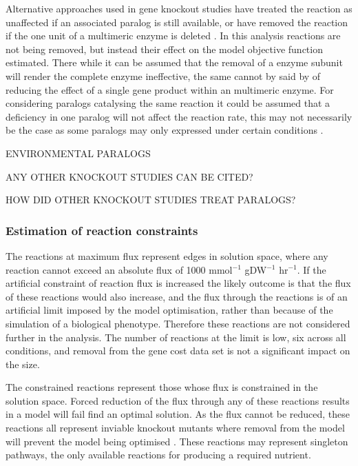 Alternative approaches used in gene knockout studies have treated the reaction as unaffected if an associated paralog is still available, or have removed the reaction if the one unit of a multimeric enzyme is deleted \cite{pal2006}. In this analysis reactions are not being removed, but instead their effect on the model objective function estimated. There while it can be assumed that the removal of a enzyme subunit will render the complete enzyme ineffective, the same cannot by said by of reducing the effect of a single gene product within an multimeric enzyme. For considering paralogs catalysing the same reaction it could be assumed that a deficiency in one paralog will not affect the reaction rate, this may not necessarily be the case as some paralogs may only expressed under certain conditions \cite{carlson2007,enviro_paralogs}.

ENVIRONMENTAL PARALOGS

ANY OTHER KNOCKOUT STUDIES CAN BE CITED?

HOW DID OTHER KNOCKOUT STUDIES TREAT PARALOGS?

\subsubsection{Estimation of reaction constraints}

The reactions at maximum flux represent edges in solution space, where any reaction cannot exceed an absolute flux of 1000 mmol$^{-1}$ gDW$^{-1}$ hr$^{-1}$. If the artificial constraint of reaction flux is increased the likely outcome is that the flux of these reactions would also increase, and the flux through the reactions is of an artificial limit imposed by the model optimisation, rather than because of the simulation of a biological phenotype. Therefore these reactions are not considered further in the analysis. The number of reactions at the limit is low, six across all conditions, and removal from the gene cost data set is not a significant impact on the size.

The constrained reactions represent those whose flux is constrained in the solution space. Forced reduction of the flux through any of these reactions results in a model will fail find an optimal solution. As the flux cannot be reduced, these reactions all represent inviable knockout mutants where removal from the model will prevent the model being optimised \cite{in_silico_knockout}. These reactions may represent singleton pathways, the only available reactions for producing a required nutrient.

